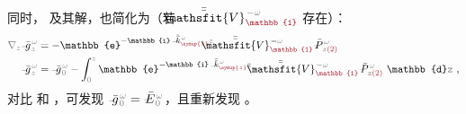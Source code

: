同时， 及其解，也简化为（若 $\xint{\mathcolor{gray}{-}}{25}{\bar{\bar{\mathsfit{V}}}}^{\;\! - \mathcolor{gray}{\omega}}_{\textcolor{Maroon}{\mathbb{1}}}$ 存在）：
\begin{subequations} \label{eq:simplify6-LE0-SVA-E'-V_1nonsingular-gg}
\begin{align}
	\mathcolor{gray}{\nabla_z} \xint{{}^{}_{\mathcolor{gray}{-}}}{10}{\bar{g}}^{\;\!\mathcolor{gray}{\omega}}_{\;\! \mathcolor{gray}{z}}
	&= - \mathbb{e}^{-\mathbb{i} \xint{\begin{smallmatrix} ~ \\ {}^{}_{\mathcolor{gray}{-}} \\ ~ \end{smallmatrix}}{15}{\bar{\bar{k}}}_{\textcolor{Maroon}{\symup{z}}}^{\;\! \mathcolor{gray}{\omega}} \mathcolor{gray}{z}} \xint{\mathcolor{gray}{-}}{25}{\bar{\bar{\mathsfit{V}}}}^{\;\! - \mathcolor{gray}{\omega}}_{\textcolor{Maroon}{\mathbb{1}}} \xint{\mathcolor{gray}{-}}{30}{\bar{P}}^{\;\! \mathcolor{gray}{\omega}}_{\;\! \mathcolor{gray}{z} \textcolor{Maroon}{(2)}} \label{eq:simplify6-LE0-SVA-E'-V_1nonsingular-g} \\
	\xint{{}^{}_{\mathcolor{gray}{-}}}{10}{\bar{g}}^{\;\!\mathcolor{gray}{\omega}}_{\;\! \mathcolor{gray}{z}}
	&= \xint{{}^{}_{\mathcolor{gray}{-}}}{10}{\bar{g}}^{\;\!\mathcolor{gray}{\omega}}_{\;\! \mathcolor{gray}{0}} - \int_{\mathcolor{gray}{0}}^{\mathcolor{gray}{z}} \mathbb{e}^{- \mathbb{i} \xint{\begin{smallmatrix} ~ \\ {}^{}_{\mathcolor{gray}{-}} \\ ~ \end{smallmatrix}}{15}{\bar{\bar{k}}}_{\textcolor{Maroon}{\symup{z}}}^{\;\! \mathcolor{gray}{\omega}} \mathcolor{gray}{\mathtt{z}}} \cdot \xint{\mathcolor{gray}{-}}{25}{\bar{\bar{\mathsfit{V}}}}^{\;\! - \mathcolor{gray}{\omega}}_{\textcolor{Maroon}{\mathbb{1}}} \xint{\mathcolor{gray}{-}}{30}{\bar{P}}^{\;\! \mathcolor{gray}{\omega}}_{\;\! \mathcolor{gray}{\mathtt{z}} \textcolor{Maroon}{(2)}} ~\mathbb{d} \mathcolor{gray}{\mathtt{z}} ~,  \label{eq:simplify6-LE0-SVA-E'-V_1nonsingular-solution-g}
\end{align}
\end{subequations}
对比  和 ，可发现 $\xint{{}^{}_{\mathcolor{gray}{-}}}{10}{\bar{g}}^{\;\!\mathcolor{gray}{\omega}}_{\;\! \mathcolor{gray}{0}} = \xint{\mathcolor{gray}{-}}{25}{\bar{E}}^{\;\!\mathcolor{gray}{\omega}}_{\;\! \mathcolor{gray}{0}}$，且重新发现 。

